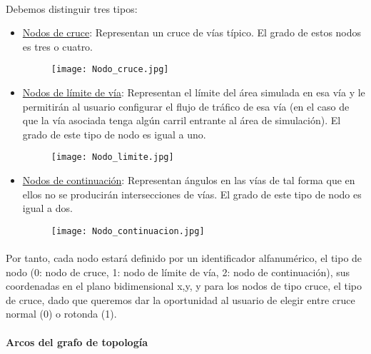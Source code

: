 	\paragraph{}
	Debemos distinguir tres tipos:
	\begin{itemize}
		\item \underline{Nodos de cruce}: Representan un cruce de vías típico. El grado de estos nodos es tres o cuatro.
		
		\begin{figure}[H]
			\centering
				\texttt{[image: Nodo\_cruce.jpg]}
		\end{figure}
	
		\item \underline{Nodos de límite de vía}: Representan el límite del área simulada en esa vía y le permitirán al usuario configurar el flujo de tráfico de esa vía (en el caso de que la vía asociada tenga algún carril entrante al área de simulación). El grado de este tipo de nodo es igual a uno.
		
		\begin{figure}[H]
			\centering
				\texttt{[image: Nodo\_limite.jpg]}
		\end{figure}
	
		\item \underline{Nodos de continuación}: Representan ángulos en las vías de tal forma que en ellos no se producirán intersecciones de vías. El grado de este tipo de nodo es igual a dos.
		
		\begin{figure}[H]
			\centering
				\texttt{[image: Nodo\_continuacion.jpg]}
		\end{figure}
	
	\end{itemize}
	
	\paragraph{}
	Por tanto, cada nodo estará definido por un identificador alfanumérico, el tipo de nodo (0: nodo de cruce, 1: nodo de límite de vía, 2: nodo de continuación), sus coordenadas en el plano bidimensional x,y, y para los nodos de tipo cruce, el tipo de cruce, dado que queremos dar la oportunidad al usuario de elegir entre cruce normal (0) o rotonda (1).
	
	\paragraph{Arcos del grafo de topología}	
